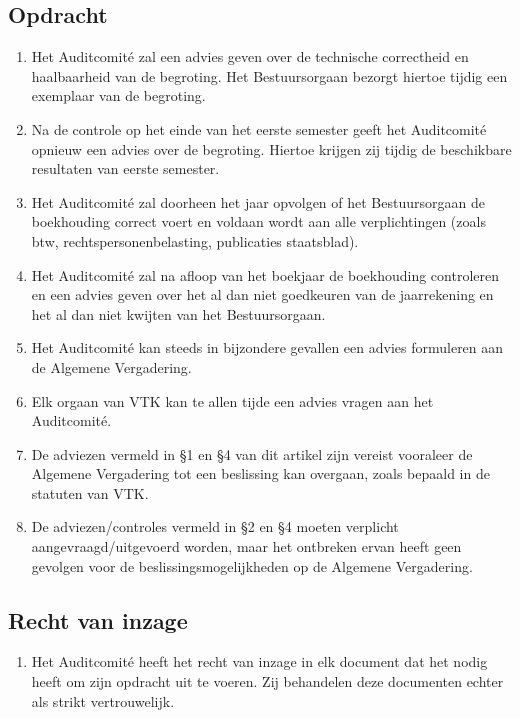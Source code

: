     \subsection{Opdracht}
    \begin{enumerate}
    \item Het Auditcomit\'e zal een advies geven over de technische correctheid en haalbaarheid van de begroting. Het Bestuursorgaan bezorgt hiertoe tijdig een exemplaar van de begroting.
    \item Na de controle op het einde van het eerste semester geeft het Auditcomit\'e opnieuw een advies over de begroting. Hiertoe krijgen zij tijdig de beschikbare resultaten van eerste semester.
    \item Het Auditcomit\'e zal doorheen het jaar opvolgen of het Bestuursorgaan de boekhouding correct voert en voldaan wordt aan alle verplichtingen (zoals btw, rechtspersonenbelasting, publicaties staatsblad).
    \item Het Auditcomit\'e zal na afloop van het boekjaar de boekhouding controleren en een advies geven over het al dan niet goedkeuren van de jaarrekening en het al dan niet kwijten van het Bestuursorgaan.
    \item Het Auditcomit\'e kan steeds in bijzondere gevallen een advies formuleren aan de Algemene Vergadering.
    \item Elk orgaan van VTK kan te allen tijde een advies vragen aan het Auditcomit\'e.
    \item De adviezen vermeld in \S1 en \S4 van dit artikel zijn vereist vooraleer de Algemene Vergadering tot een beslissing kan overgaan, zoals bepaald in de statuten van VTK. 
    \item De adviezen/controles vermeld in \S2 en \S4 moeten verplicht aangevraagd/uitgevoerd worden, maar het ontbreken ervan heeft geen gevolgen voor de beslissingsmogelijkheden op de Algemene Vergadering.
    \end{enumerate}

    \subsection{Recht van inzage}
    \begin{enumerate}
    \item Het Auditcomit\'e heeft het recht van inzage in elk document dat het nodig heeft om zijn opdracht uit te voeren. Zij behandelen deze documenten echter als strikt vertrouwelijk.
    \end{enumerate}

